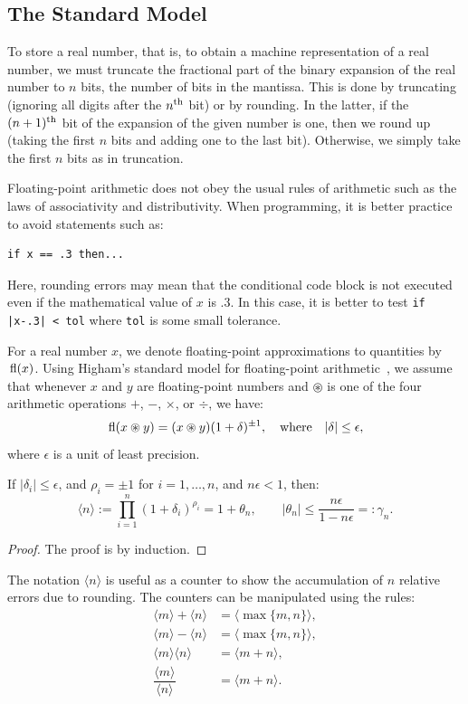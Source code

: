 \subsection{The Standard Model}

To store a real number, that is, to obtain a machine representation of a real number, we must truncate the fractional part of the binary expansion of the real number to $n$ bits, the number of bits in the mantissa. This is done by truncating (ignoring all digits after the $n^{\rm th}$ bit) or by rounding. In the latter, if the $(n+1)^{\rm th}$ bit of the expansion of the given number is one, then we round up (taking the first $n$ bits and adding one to the last bit). Otherwise, we simply take the first $n$ bits as in truncation.

Floating-point arithmetic does not obey the usual rules of arithmetic such as the laws of associativity and distributivity. When programming, it is better practice to avoid statements such as:
\begin{verbatim}
if x == .3 then...
\end{verbatim}
Here, rounding errors may mean that the conditional code block is not executed even if the mathematical value of $x$ is $.3$. In this case, it is better to test \verb+if |x-.3| < tol+ where \verb+tol+ is some small tolerance.

For a real number $x$, we denote floating-point approximations to quantities by ${\rm\,fl}(x)$. Using Higham's standard model for floating-point arithmetic~\cite{Higham-02}, we assume that whenever $x$ and $y$ are floating-point numbers and $\circledast$ is one of the four arithmetic operations $+$, $-$, $\times$, or $\div$, we have:
\begin{equation}
{\rm\,fl}(x\circledast y) = (x\circledast y)(1+\delta)^{\pm1},\quad{\rm where}\quad |\delta| \le \epsilon,
\end{equation}
where $\epsilon$ is a unit of least precision.

\begin{lemma}
If $|\delta_i|\le \epsilon$, and $\rho_i=\pm1$ for $i=1,\ldots,n$, and $n\epsilon<1$, then:
\begin{equation}
\langle n \rangle := \prod_{i=1}^n(1+\delta_i)^{\rho_i} = 1+\theta_n,\qquad |\theta_n| \le \dfrac{n\epsilon}{1-n\epsilon} =:\gamma_n.
\end{equation}
\end{lemma}
\begin{proof}
The proof is by induction.
\end{proof}
The notation $\langle n \rangle$ is useful as a counter to show the accumulation of $n$ relative errors due to rounding. The counters can be manipulated using the rules:
\begin{align}
\langle m\rangle + \langle n\rangle & = \langle\max\{m,n\}\rangle,\\
\langle m\rangle - \langle n\rangle & = \langle\max\{m,n\}\rangle,\\
\langle m\rangle\langle n\rangle & = \langle m+n\rangle,\\
\dfrac{\langle m\rangle}{\langle n\rangle} & = \langle m+n\rangle.
\end{align}

